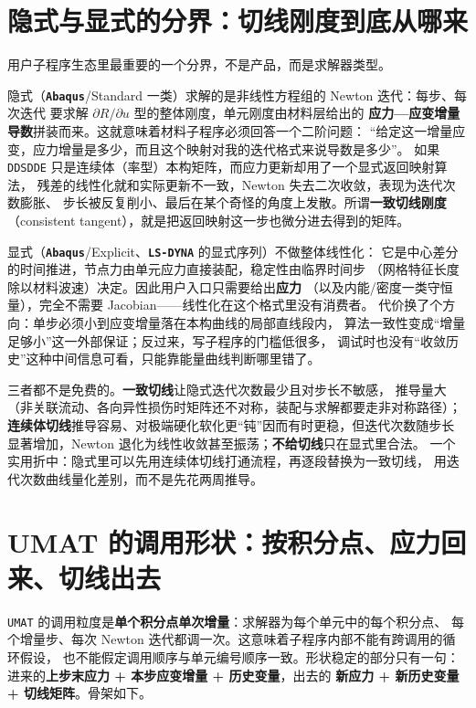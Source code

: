 \documentclass[12pt,a4paper,fontset=fandol]{ctexbook}
\newcommand{\Tp}[1]{\texttt{#1}}
\newcommand{\Lib}[1]{\textbf{\texttt{#1}}}
\begin{document}
\section{隐式与显式的分界：切线刚度到底从哪来}
\label{sec:ch05-implicit-explicit}

用户子程序生态里最重要的一个分界，不是产品，而是求解器类型。

隐式（\Lib{Abaqus}/Standard 一类）求解的是非线性方程组的 Newton 迭代：每步、每次迭代
要求解 $\partial R/\partial u$ 型的整体刚度，单元刚度由材料层给出的
\textbf{应力—应变增量导数}拼装而来。这就意味着材料子程序必须回答一个二阶问题：
``给定这一增量应变，应力增量是多少，而且这个映射对我的迭代格式来说导数是多少''。
如果 \Tp{DDSDDE} 只是连续体（率型）本构矩阵，而应力更新却用了一个显式返回映射算法，
残差的线性化就和实际更新不一致，Newton 失去二次收敛，表现为迭代次数膨胀、
步长被反复削小、最后在某个奇怪的角度上发散。所谓\textbf{一致切线刚度}
（consistent tangent），就是把返回映射这一步也微分进去得到的矩阵。

显式（\Lib{Abaqus}/Explicit、\Lib{LS-DYNA} 的显式序列）不做整体线性化：
它是中心差分的时间推进，节点力由单元应力直接装配，稳定性由临界时间步
（网格特征长度除以材料波速）决定。因此用户入口只需要给出\textbf{应力}
（以及内能/密度一类守恒量），完全不需要 Jacobian——线性化在这个格式里没有消费者。
代价换了个方向：单步必须小到应变增量落在本构曲线的局部直线段内，
算法一致性变成``增量足够小''这一外部保证；反过来，写子程序的门槛低很多，
调试时也没有``收敛历史''这种中间信息可看，只能靠能量曲线判断哪里错了。

\begin{compare}[title={一致切线、连续体切线与干脆不给切线}]
三者都不是免费的。\textbf{一致切线}让隐式迭代次数最少且对步长不敏感，
推导量大（非关联流动、各向异性损伤时矩阵还不对称，装配与求解都要走非对称路径）；
\textbf{连续体切线}推导容易、对极端硬化软化更``钝''因而有时更稳，但迭代次数随步长
显著增加，Newton 退化为线性收敛甚至振荡；\textbf{不给切线}只在显式里合法。
一个实用折中：隐式里可以先用连续体切线打通流程，再逐段替换为一致切线，
用迭代次数曲线量化差别，而不是先花两周推导。
\end{compare}

\section{UMAT 的调用形状：按积分点、应力回来、切线出去}
\label{sec:ch05-umat-shape}

\Tp{UMAT} 的调用粒度是\textbf{单个积分点单次增量}：求解器为每个单元中的每个积分点、
每个增量步、每次 Newton 迭代都调一次。这意味着子程序内部不能有跨调用的循环假设，
也不能假定调用顺序与单元编号顺序一致。形状稳定的部分只有一句：
进来的\textbf{上步末应力 + 本步应变增量 + 历史变量}，出去的
\textbf{新应力 + 新历史变量 + 切线矩阵}。骨架如下。
\end{document}
